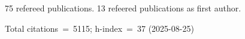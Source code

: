 75 refereed publications. 13 refeered publications as first author.

Total citations~=~5115; h-index~=~37 (2025-08-25)